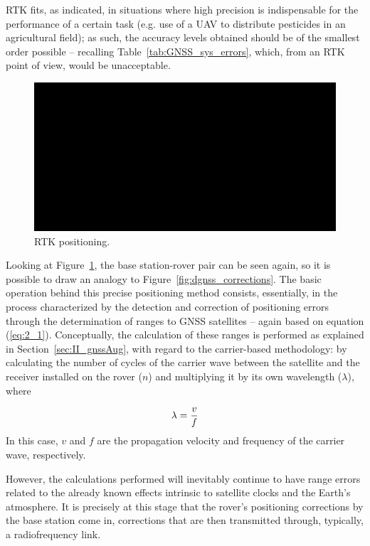 RTK fits, as indicated, in situations where high precision is indispensable for the performance of a certain task (e.g. use of a UAV to distribute pesticides in an agricultural field); as such, the accuracy levels obtained should be of the smallest order possible -- recalling Table~\ref{tab:GNSS_sys_errors}, which, from an RTK point of view, would be unacceptable.

\begin{figure}[ht]
	\centering
	\includegraphics[width=1.0\textwidth]{Chapters/Figures/demo.png}
	\caption{RTK positioning.}
	\label{fig:rtk_workings}
\end{figure}

Looking at Figure~\ref{fig:rtk_workings}, the base station-rover pair can be seen again, so it is possible to draw an analogy to Figure~\ref{fig:dgnss_corrections}. The basic operation behind this precise positioning method consists, essentially, in the process characterized by the detection and correction of positioning errors through the determination of ranges to GNSS satellites -- again based on equation (\ref{eq:2_1}). Conceptually, the calculation of these ranges is performed as explained in Section~\ref{sec:II_gnssAug}, with regard to the carrier-based methodology: by calculating the number of cycles of the carrier wave between the satellite and the receiver installed on the rover ($n$) and multiplying it by its own wavelength ($\lambda$), where

\begin{equation}\label{eq:2_4}
    \lambda = \frac{v}{f}\medskip
\end{equation}
In this case, $v$ and $f$ are the propagation velocity and frequency of the carrier wave, respectively.

However, the calculations performed will inevitably continue to have range errors related to the already known effects intrinsic to satellite clocks and the Earth's atmosphere. It is precisely at this stage that the rover's positioning corrections by the base station come in, corrections that are then transmitted through, typically, a radiofrequency link.

